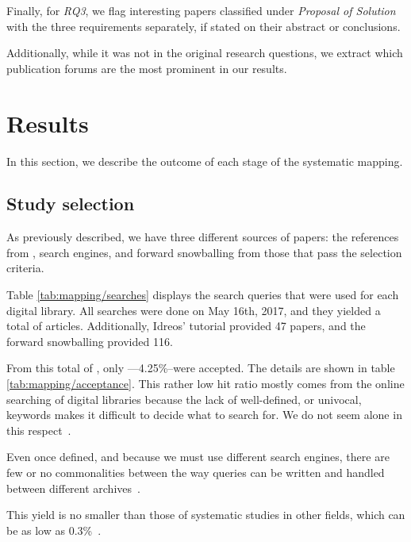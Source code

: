 Finally, for \emph{RQ3}, we flag interesting papers classified under
\emph{Proposal of Solution} with the three requirements separately, if stated
on their abstract or conclusions.

Additionally, while it was not in the original research questions, we
extract which publication forums are the most prominent in our results.

\section{Results}
\label{sec:mapping/results}
In this section, we describe the outcome of each stage of the systematic mapping.

\subsection{Study selection}
As previously described, we have three different sources of papers:
the references from \cite{Idreos2015}, search engines, and forward snowballing
from those that pass the selection criteria.

Table \ref{tab:mapping/searches} displays the search queries that were used for
each digital library.
All searches were done on May 16th, 2017, and they yielded a total of  articles.
Additionally, Idreos' tutorial provided 47 papers, and the forward snowballing provided 116.

From this total of , only ---4.25\%--were accepted.
The details are shown in table \ref{tab:mapping/acceptance}. This rather low hit ratio
mostly comes from the online searching of digital libraries
because the lack of well-defined, or univocal, keywords makes it difficult to decide 
what to search for. We do not seem alone in this respect~\cite{Kitchenham2013,Jorgensen2007}.

Even once defined, and because we must use different search engines, there are
few or no commonalities between the way queries can be written and handled
between different archives~\cite{Bailey2007, Brereton2007}.

This yield is no smaller than those of systematic studies in
other fields, which can be as low as 0.3\%~\cite{Oakley2003}.

